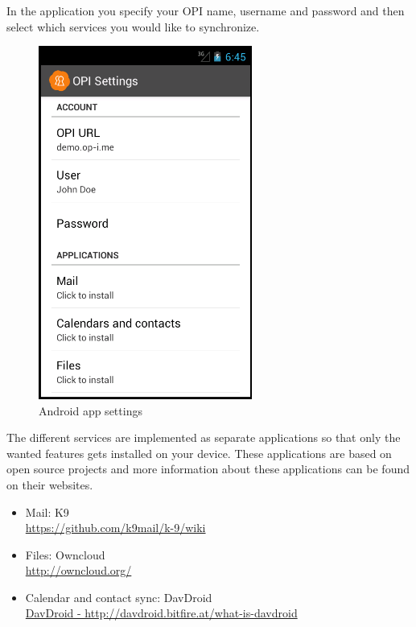 \documentclass[12pt,a4paper,titlepage]{article}
\begin{document}
In the application you specify your OPI name, username and password and then select which services you would like to synchronize.
\begin{figure}[h!]
\centering
\includegraphics[width=7cm]{./img/opi-settings}
\caption{Android app settings}
\end{figure}
The different services are implemented as separate applications so that only the wanted features gets installed on your device.
These applications are based on open source projects and more information about these applications can be found on their websites.

\begin{itemize}
\item Mail: K9\\ \href{https://github.com/k9mail/k-9/wiki}{https://github.com/k9mail/k-9/wiki}
\item Files: Owncloud\\ \href{http://owncloud.org/}{http://owncloud.org/}
\item Calendar and contact sync: DavDroid \\ \href{http://davdroid.bitfire.at/what-is-davdroid}{DavDroid - http://davdroid.bitfire.at/what-is-davdroid}
\end{itemize}

\newpage
\end{document}
